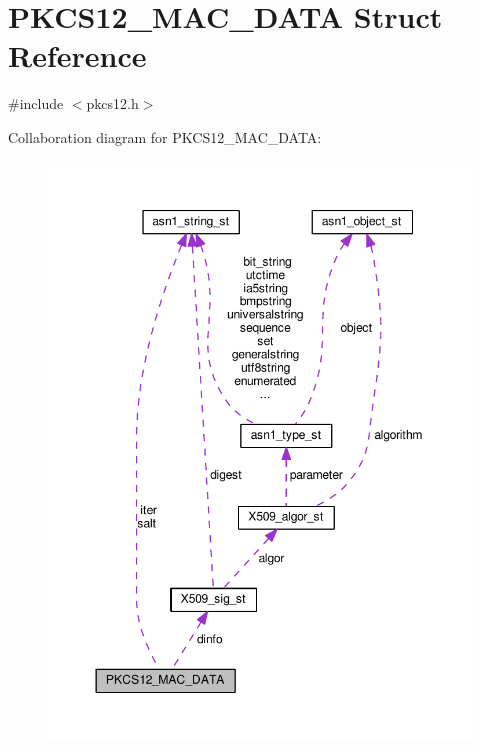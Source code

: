 \hypertarget{struct_p_k_c_s12___m_a_c___d_a_t_a}{}\section{P\+K\+C\+S12\+\_\+\+M\+A\+C\+\_\+\+D\+A\+TA Struct Reference}
\label{struct_p_k_c_s12___m_a_c___d_a_t_a}


{\ttfamily \#include $<$pkcs12.\+h$>$}



Collaboration diagram for P\+K\+C\+S12\+\_\+\+M\+A\+C\+\_\+\+D\+A\+TA\+:
\nopagebreak
\begin{figure}[H]
\begin{center}
\leavevmode
\includegraphics[width=350pt]{struct_p_k_c_s12___m_a_c___d_a_t_a__coll__graph}
\end{center}
\end{figure}

